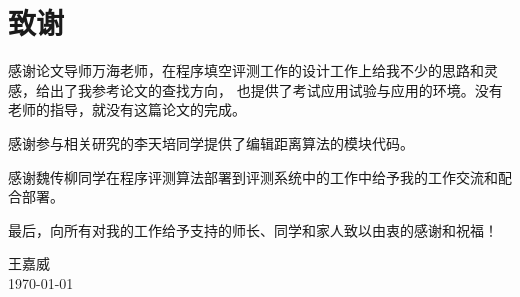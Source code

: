 \chapter{致谢}
感谢论文导师万海老师，在程序填空评测工作的设计工作上给我不少的思路和灵感，给出了我参考论文的查找方向，
也提供了考试应用试验与应用的环境。没有老师的指导，就没有这篇论文的完成。

感谢参与相关研究的李天培同学提供了编辑距离算法的模块代码。

感谢魏传柳同学在程序评测算法部署到评测系统中的工作中给予我的工作交流和配合部署。

最后，向所有对我的工作给予支持的师长、同学和家人致以由衷的感谢和祝福！

\vskip 108pt
\begin{flushright}
	王嘉威\makebox[1cm]{}\\
\today
\end{flushright}

\endinput
